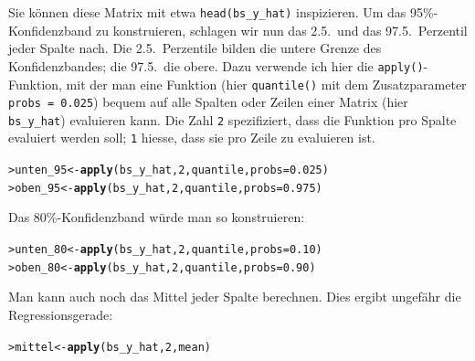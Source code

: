 \documentclass[oneside, 10pt]{book}\usepackage[]{graphicx}\usepackage[]{xcolor}
\makeatletter
\newcommand{\hlnum}[1]{\textcolor[rgb]{0.686,0.059,0.569}{#1}}%
\newcommand{\hlstd}[1]{\textcolor[rgb]{0.345,0.345,0.345}{#1}}%
\newcommand{\hlkwb}[1]{\textcolor[rgb]{0.69,0.353,0.396}{#1}}%
\newcommand{\hlkwc}[1]{\textcolor[rgb]{0.333,0.667,0.333}{#1}}%
\newcommand{\hlkwd}[1]{\textcolor[rgb]{0.737,0.353,0.396}{\textbf{#1}}}%
\newenvironment{kframe}{%
 \def\at@end@of@kframe{}%
 \ifinner\ifhmode%
  \def\at@end@of@kframe{\end{minipage}}%
  \begin{minipage}{\columnwidth}%
 \fi\fi%
 \def\FrameCommand##1{\hskip\@totalleftmargin \hskip-\fboxsep
 \colorbox{shadecolor}{##1}\hskip-\fboxsep
     \hskip-\linewidth \hskip-\@totalleftmargin \hskip\columnwidth}%
 \MakeFramed {\advance\hsize-\width
   \@totalleftmargin\z@ \linewidth\hsize
   \@setminipage}}%
 {\par\unskip\endMakeFramed%
 \at@end@of@kframe}
\newenvironment{knitrout}{}{} %
\makeatother
\begin{document}
Sie können diese Matrix mit etwa \texttt{head(bs\_y\_hat)} inspizieren.
Um das 95\%-Kon\-fi\-denz\-band zu konstruieren, schlagen wir nun das 2.5.\ und
das 97.5.\ Perzentil jeder Spalte nach.
Die 2.5.\ Perzentile bilden
die untere Grenze des Konfidenzbandes; die 97.5.\ die obere.
Dazu verwende ich hier die \texttt{apply()}-Funktion, mit der
man eine Funktion (hier \texttt{quantile()} mit dem Zusatzparameter \texttt{probs = 0.025})
bequem auf alle Spalten oder Zeilen einer Matrix (hier \texttt{bs\_y\_hat}) evaluieren kann.
Die Zahl \texttt{2} spezifiziert, dass die Funktion pro Spalte evaluiert werden soll;
\texttt{1} hiesse, dass sie pro Zeile zu evaluieren ist.
\begin{knitrout}
\color{fgcolor}\begin{kframe}
\begin{alltt}
\hlstd{> }\hlstd{unten_95} \hlkwb{<-} \hlkwd{apply}\hlstd{(bs_y_hat,} \hlnum{2}\hlstd{, quantile,} \hlkwc{probs} \hlstd{=} \hlnum{0.025}\hlstd{)}
\hlstd{> }\hlstd{oben_95} \hlkwb{<-} \hlkwd{apply}\hlstd{(bs_y_hat,} \hlnum{2}\hlstd{, quantile,} \hlkwc{probs} \hlstd{=} \hlnum{0.975}\hlstd{)}
\end{alltt}
\end{kframe}
\end{knitrout}

Das 80\%-Konfidenzband würde man so konstruieren:
\begin{knitrout}
\color{fgcolor}\begin{kframe}
\begin{alltt}
\hlstd{> }\hlstd{unten_80} \hlkwb{<-} \hlkwd{apply}\hlstd{(bs_y_hat,} \hlnum{2}\hlstd{, quantile,} \hlkwc{probs} \hlstd{=} \hlnum{0.10}\hlstd{)}
\hlstd{> }\hlstd{oben_80} \hlkwb{<-} \hlkwd{apply}\hlstd{(bs_y_hat,} \hlnum{2}\hlstd{, quantile,} \hlkwc{probs} \hlstd{=} \hlnum{0.90}\hlstd{)}
\end{alltt}
\end{kframe}
\end{knitrout}

Man kann auch noch das Mittel jeder Spalte berechnen. Dies
ergibt ungefähr die Regressionsgerade:
\begin{knitrout}
\color{fgcolor}\begin{kframe}
\begin{alltt}
\hlstd{> }\hlstd{mittel} \hlkwb{<-} \hlkwd{apply}\hlstd{(bs_y_hat,} \hlnum{2}\hlstd{, mean)}
\end{alltt}
\end{kframe}
\end{knitrout}
\end{document}
